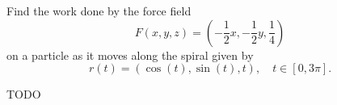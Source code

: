 \begin{exercise}
	Find the work done by the force field
	$$
		F(x,y,z) = \left(-\frac{1}{2}x, -\frac{1}{2}y, \frac{1}{4}\right)
	$$
	on a particle as it moves along the spiral given by
	$$
		r(t) = (\cos(t), \sin(t), t), \quad t \in [0, 3\pi].
	$$
\end{exercise}

\begin{solution}
	TODO
\end{solution}
